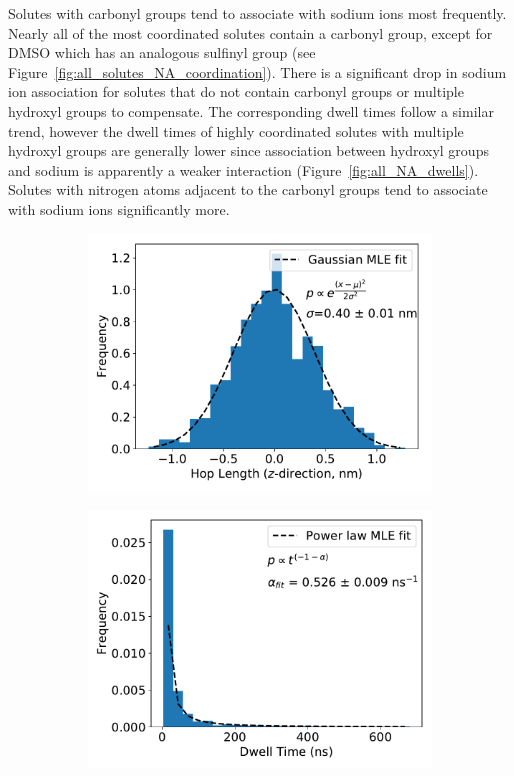 \documentclass{article}
\begin{document}
  Solutes with carbonyl groups tend to associate with sodium ions most frequently.
  Nearly all of the most coordinated solutes contain a carbonyl group, except
  for DMSO which has an analogous sulfinyl group (see 
  Figure~\ref{fig:all_solutes_NA_coordination}). There is a significant drop
  in sodium ion association for solutes that do not contain carbonyl groups or
  multiple hydroxyl groups to compensate. The corresponding dwell times 
  follow a similar trend, however the dwell times of highly coordinated solutes
  with multiple hydroxyl groups are generally lower since association between
  hydroxyl groups and sodium is apparently a weaker interaction 
  (Figure~\ref{fig:all_NA_dwells}). Solutes with nitrogen atoms adjacent to 
  the carbonyl groups tend to associate with sodium ions significantly more.
  
  \begin{figure}[h!]
  \centering
  \begin{subfigure}{0.325\textwidth}
  \includegraphics[width=\linewidth]{hop_distribution_GCL.pdf}
  \caption{}\label{fig:hop_dist}
  \end{subfigure}
  \begin{subfigure}{0.325\textwidth}
  \includegraphics[width=\linewidth]{dwell_distribution_GCL.pdf}

\end{subfigure}
\end{figure}
\end{document}

